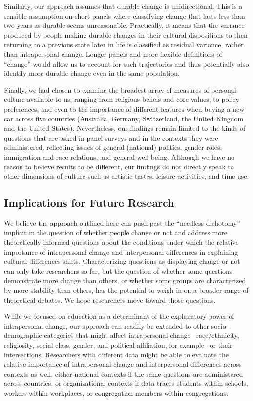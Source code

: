 \documentclass[
  12pt,
]{article}
\begin{document}
Similarly, our approach assumes that durable change is unidirectional.
This is a sensible assumption on short panels where classifying change
that lasts less than two years as durable seems unreasonable.
Practically, it means that the variance produced by people making
durable changes in their cultural dispositions to then returning to a
previous state later in life is classified as residual variance, rather
than intrapersonal change. Longer panels and more flexible definitions
of ``change'' would allow us to account for such trajectories and thus
potentially also identify more durable change even in the same
population.

Finally, we had chosen to examine the broadest array of measures of
personal culture available to us, ranging from religious beliefs and
core values, to policy preferences, and even to the importance of
different features when buying a new car across five countries
(Australia, Germany, Switzerland, the United Kingdom and the United
States). Nevertheless, our findings remain limited to the kinds of
questions that are asked in panel surveys and in the contexts they were
administered, reflecting issues of general (national) politics, gender
roles, immigration and race relations, and general well being. Although
we have no reason to believe results to be different, our findings do
not directly speak to other dimensions of culture such as artistic
tastes, leisure activities, and time use.

\hypertarget{implications-for-future-research}{%
\subsection{Implications for Future
Research}\label{implications-for-future-research}}

We believe the approach outlined here can push past the ``needless
dichotomy'' implicit in the question of whether people change or not and
address more theoretically informed questions about the conditions under
which the relative importance of intrapersonal change and interpersonal
differences in explaining cultural differences shifts. Characterizing
questions as displaying change or not can only take researchers so far,
but the question of whether some questions demonstrate more change than
others, or whether some groups are characterized by more stability than
others, has the potential to weigh in on a broader range of theoretical
debates. We hope researchers move toward those questions.

While we focused on education as a determinant of the explanatory power
of intrapersonal change, our approach can readily be extended to other
socio-demographic categories that might affect intrapersonal change
--race/ethnicity, religiosity, social class, gender, and political
affiliation, for example-- or their intersections. Researchers with
different data might be able to evaluate the relative importance of
intrapersonal change and interpersonal differences across contexts as
well, either national contexts if the same questions are administered
across countries, or organizational contexts if data traces students
within schools, workers within workplaces, or congregation members
within congregations.
\end{document}
